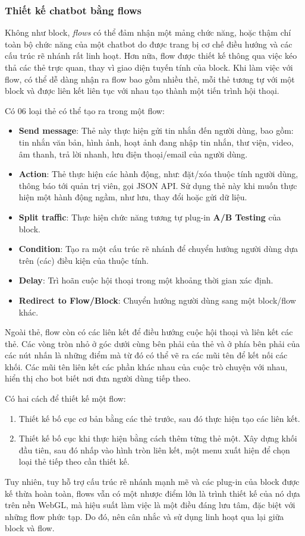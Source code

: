 \subsubsection{Thiết kế chatbot bằng flows}
Không như block, \textit{flows} có thể đảm nhận một mảng chức năng, hoặc thậm chí toàn bộ chức năng của một chatbot do được trang bị cơ chế điều hướng và các cấu trúc rẽ nhánh rất linh hoạt. Hơn nữa, flow được thiết kế thông qua việc kéo thả các thẻ trực quan, thay vì giao diện tuyến tính của block. Khi làm việc với flow, có thể dễ dàng nhận ra flow bao gồm nhiều thẻ, mỗi thẻ tương tự với một block và được liên kết liên tục với nhau tạo thành một tiến trình hội thoại.\par
Có 06 loại thẻ có thể tạo ra trong một flow: \begin{itemize}
	\item \textbf{Send message}: Thẻ này thực hiện gửi tin nhắn đến người dùng, bao gồm: tin nhắn văn bản, hình ảnh, hoạt ảnh đang nhập tin nhắn, thư viện, video, âm thanh, trả lời nhanh, lưu điện thoại/email của người dùng.
	\item \textbf{Action}: Thẻ thực hiện các hành động, như: đặt/xóa thuộc tính người dùng, thông báo tới quản trị viên, gọi JSON API. Sử dụng thẻ này khi muốn thực hiện một hành động ngầm, như lưu, thay đổi hoặc gửi dữ liệu.
	\item \textbf{Split traffic}: Thực hiện chức năng tương tự plug-in \textbf{A/B Testing} của block.
	\item \textbf{Condition}: Tạo ra một cấu trúc rẽ nhánh để chuyển hướng người dùng dựa trên (các) điều kiện của thuộc tính.
	\item \textbf{Delay}: Trì hoãn cuộc hội thoại trong một khoảng thời gian xác định.
	\item \textbf{Redirect to Flow/Block}: Chuyển hướng người dùng sang một block/flow khác.
\end{itemize}
Ngoài thẻ, flow còn có các liên kết để điều hướng cuộc hội thoại và liên kết các thẻ. Các vòng tròn nhỏ ở góc dưới cùng bên phải của thẻ và ở phía bên phải của các nút nhấn là những điểm mà từ đó có thể vẽ ra các mũi tên để kết nối các khối. Các mũi tên liên kết các phần khác nhau của cuộc trò chuyện với nhau, hiển thị cho bot biết nơi đưa người dùng tiếp theo.\par
Có hai cách để thiết kế một flow: \begin{enumerate}[label=\textbf{\arabic*.}]
	\item Thiết kế bố cục cơ bản bằng các thẻ trước, sau đó thực hiện tạo các liên kết.
	\item Thiết kế bố cục khi thực hiện bằng cách thêm từng thẻ một. Xây dựng khối đầu tiên, sau đó nhấp vào hình tròn liên kết, một menu xuất hiện để chọn loại thẻ tiếp theo cần thiết kế.
\end{enumerate}\par
Tuy nhiên, tuy hỗ trợ cấu trúc rẽ nhánh mạnh mẽ và các plug-in của block được kế thừa hoàn toàn, flows vẫn có một nhược điểm lớn là trình thiết kế của nó dựa trên nền WebGL, mà hiệu suất làm việc là một điều đáng lưu tâm, đặc biệt với những flow phức tạp. Do đó, nên cân nhắc và sử dụng linh hoạt qua lại giữa block và flow.\par

